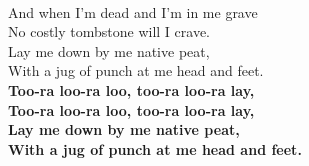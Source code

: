 ~\\
And when I'm dead and I'm in me grave\\
No costly tombstone will I crave.\\
Lay me down by me native peat,\\
With a jug of punch at me head and feet.\\
\textbf{Too-ra loo-ra loo, too-ra loo-ra lay,\\
Too-ra loo-ra loo, too-ra loo-ra lay,\\
Lay me down by me native peat,\\
With a jug of punch at me head and feet.}\\


